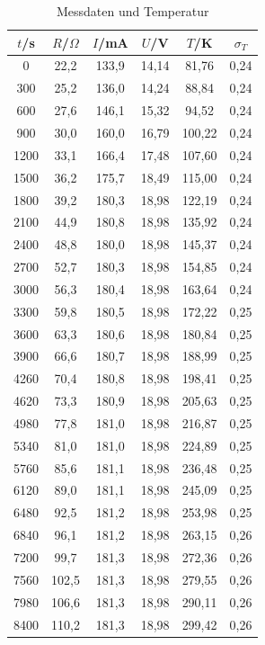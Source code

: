 \begin{table}[H]
	\begin{center}
		\begin{tabular}{c c c c c c}
			\toprule
			\(t\)/s & \(R\)/\(\Omega\) & \(I\)/mA & \(U\)/V & \(T\)/K & \(\sigma_T\) \\
			\midrule
			0		&22,2		&133,9	&14,14	&81,76	&0,24 \\
			300		&25,2		&136,0	&14,24	&88,84	&0,24 \\
			600		&27,6		&146,1	&15,32	&94,52	&0,24 \\
			900		&30,0		&160,0	&16,79	&100,22	&0,24 \\
			1200	&33,1		&166,4	&17,48	&107,60	&0,24 \\
			1500	&36,2		&175,7	&18,49	&115,00	&0,24 \\
			1800	&39,2		&180,3	&18,98	&122,19	&0,24 \\
			2100	&44,9		&180,8	&18,98	&135,92	&0,24 \\
			2400	&48,8		&180,0	&18,98	&145,37	&0,24 \\
			2700	&52,7		&180,3	&18,98	&154,85	&0,24 \\
			3000	&56,3		&180,4	&18,98	&163,64	&0,24 \\
			3300	&59,8		&180,5	&18,98	&172,22	&0,25 \\
			3600	&63,3		&180,6	&18,98	&180,84	&0,25 \\
			3900	&66,6		&180,7	&18,98	&188,99	&0,25 \\
			4260	&70,4		&180,8	&18,98	&198,41	&0,25 \\
			4620	&73,3		&180,9	&18,98	&205,63	&0,25 \\
			4980	&77,8		&181,0	&18,98	&216,87	&0,25 \\
			5340	&81,0		&181,0	&18,98	&224,89	&0,25 \\
			5760	&85,6		&181,1	&18,98	&236,48	&0,25 \\
			6120	&89,0		&181,1	&18,98	&245,09	&0,25 \\
			6480	&92,5		&181,2	&18,98	&253,98	&0,25 \\
			6840	&96,1		&181,2	&18,98	&263,15	&0,26 \\
			7200	&99,7		&181,3	&18,98	&272,36	&0,26 \\
			7560	&102,5		&181,3	&18,98	&279,55	&0,26 \\
			7980	&106,6		&181,3	&18,98	&290,11	&0,26 \\
			8400	&110,2		&181,3	&18,98	&299,42	&0,26 \\
			\bottomrule
		\end{tabular}
		\caption{Messdaten und Temperatur}
		\label{fig:tab1}
	\end{center}
\end{table}

